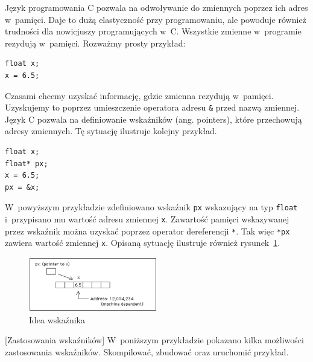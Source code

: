 Język programowania C pozwala na odwoływanie do zmiennych poprzez ich adres w~pamięci. Daje to dużą elastyczność przy programowaniu, ale powoduje również trudności dla nowicjuszy programujących w~C. Wszystkie zmienne w~programie rezydują w~pamięci. Rozważmy prosty przykład: 

\begin{lstlisting}[style=MyCStyle]
float x;
x = 6.5;
\end{lstlisting}

Czasami chcemy uzyskać informację, gdzie zmienna rezydują w~pamięci. Uzyskujemy to poprzez umieszczenie operatora adresu \lstinline[style=MyCStyle]{&} przed nazwą zmiennej. Język C pozwala na definiowanie wskaźników (ang. pointers), które przechowują adresy zmiennych. Tę sytuację ilustruje kolejny przykład. 

\begin{lstlisting}[style=MyCStyle]
float x;
float* px;
x = 6.5;
px = &x;
\end{lstlisting}

W~powyższym przykładzie zdefiniowano wskaźnik \lstinline[style=MyCStyle]{px} wskazujący na typ \lstinline[style=MyCStyle]{float} i~przypisano mu wartość adresu zmiennej \lstinline[style=MyCStyle]{x}. Zawartość pamięci wskazywanej przez wskaźnik można uzyskać poprzez operator dereferencji \lstinline[style=MyCStyle]{*}. Tak więc \lstinline[style=MyCStyle]{*px} zawiera wartość zmiennej \lstinline[style=MyCStyle]{x}. Opisaną sytuację ilustruje również rysunek~\ref{fig:wskaznik}.

\begin{figure}[!h]
\centering
\includegraphics[width=0.5\textwidth]{img/pointer}
\caption{Idea wskaźnika}
\label{fig:wskaznik}
\end{figure}

\begin{example}{[Zastosowania wskaźników]}
W~poniższym przykładzie pokazano kilka możliwości zastosowania wskaźników. Skompilować, zbudować oraz uruchomić przykład.  



\end{example}

